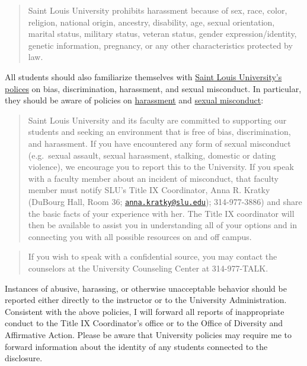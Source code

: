\documentclass[]{book}
\theoremstyle{definition}
\theoremstyle{definition}
\theoremstyle{definition}
\theoremstyle{remark}
\begin{document}
\begin{quote}
Saint Louis University prohibits harassment because of sex, race, color,
religion, national origin, ancestry, disability, age, sexual
orientation, marital status, military status, veteran status, gender
expression/identity, genetic information, pregnancy, or any other
characteristics protected by law.
\end{quote}

All students should also familiarize themselves with
\href{http://www.slu.edu/general-counsel-home/office-of-institutional-equity-and-diversity}{Saint
Louis University's polices} on bias, discrimination, harassment, and
sexual misconduct. In particular, they should be aware of policies on
\href{https://www.slu.edu/general-counsel/institutional-equity-diversity/pdfs/harassment-policy.pdf}{harassment}
and
\href{https://www.slu.edu/about/safety/sexual-assault-resources.php}{sexual
misconduct}:

\begin{quote}
Saint Louis University and its faculty are committed to supporting our
students and seeking an environment that is free of bias,
discrimination, and harassment. If you have encountered any form of
sexual misconduct (e.g.~sexual assault, sexual harassment, stalking,
domestic or dating violence), we encourage you to report this to the
University. If you speak with a faculty member about an incident of
misconduct, that faculty member must notify SLU's Title IX Coordinator,
Anna R. Kratky (DuBourg Hall, Room 36;
\href{mailto:anna.kratky@slu.edu}{\nolinkurl{anna.kratky@slu.edu}});
314-977-3886) and share the basic facts of your experience with her. The
Title IX coordinator will then be available to assist you in
understanding all of your options and in connecting you with all
possible resources on and off campus.
\end{quote}

\begin{quote}
If you wish to speak with a confidential source, you may contact the
counselors at the University Counseling Center at 314-977-TALK.
\end{quote}

Instances of abusive, harassing, or otherwise unacceptable behavior
should be reported either directly to the instructor or to the
University Administration. Consistent with the above policies, I will
forward all reports of inappropriate conduct to the Title IX
Coordinator's office or to the Office of Diversity and Affirmative
Action. Please be aware that University policies may require me to
forward information about the identity of any students connected to the
disclosure.
\end{document}

